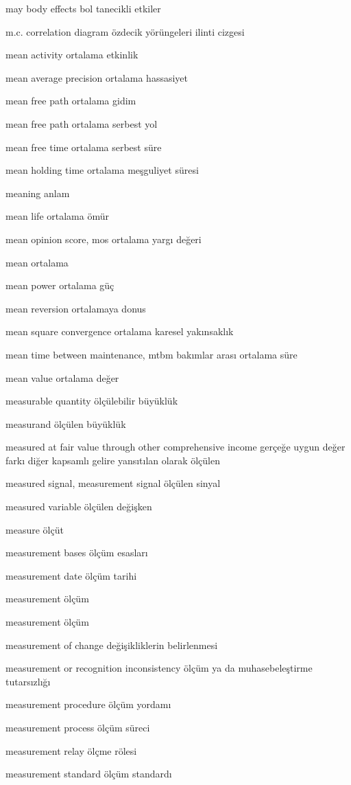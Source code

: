 \documentclass[12pt,fleqn]{article}\usepackage{../../common}
\begin{document}
may body effects bol tanecikli etkiler

m.c. correlation diagram özdecik yörüngeleri ilinti cizgesi

mean activity ortalama etkinlik

mean average precision ortalama hassasiyet

mean free path ortalama gidim

mean free path ortalama serbest yol

mean free time ortalama serbest süre

mean holding time ortalama meşguliyet süresi

meaning anlam

mean life ortalama ömür

mean opinion score, mos ortalama yargı değeri

mean ortalama

mean power ortalama güç

mean reversion ortalamaya donus

mean square convergence ortalama karesel yakınsaklık

mean time between maintenance, mtbm bakımlar arası ortalama süre

mean value ortalama değer

measurable quantity ölçülebilir büyüklük

measurand ölçülen büyüklük

measured at fair value through other comprehensive income gerçeğe uygun değer farkı diğer kapsamlı gelire yansıtılan olarak ölçülen

measured signal, measurement signal ölçülen sinyal

measured variable ölçülen değişken

measure ölçüt

measurement bases ölçüm esasları

measurement date ölçüm tarihi

measurement ölçüm

measurement ölçüm

measurement of change değişikliklerin belirlenmesi

measurement or recognition inconsistency ölçüm ya da muhasebeleştirme tutarsızlığı

measurement procedure ölçüm yordamı

measurement process ölçüm süreci

measurement relay ölçme rölesi

measurement standard ölçüm standardı
\end{document}
